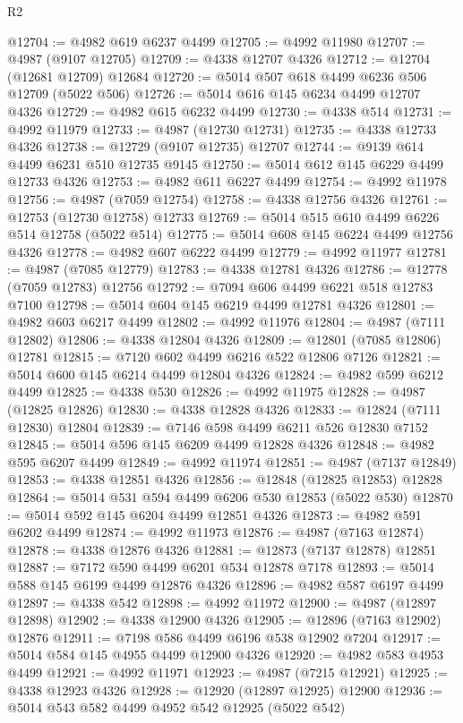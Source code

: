 \begin{lexlean}{R2}
\begin{coremodule}
@12704 := @4982 @619 @6237 @4499
@12705 := @4992 @11980
@12707 := @4987 (@9107 @12705)
@12709 := @4338 @12707 @4326
@12712 := @12704 (@12681 @12709) @12684
@12720 := @5014 @507 @618 @4499 @6236 @506 @12709 (@5022 @506)
@12726 := @5014 @616 @145 @6234 @4499 @12707 @4326
@12729 := @4982 @615 @6232 @4499
@12730 := @4338 @514
@12731 := @4992 @11979
@12733 := @4987 (@12730 @12731)
@12735 := @4338 @12733 @4326
@12738 := @12729 (@9107 @12735) @12707
@12744 := @9139 @614 @4499 @6231 @510 @12735 @9145
@12750 := @5014 @612 @145 @6229 @4499 @12733 @4326
@12753 := @4982 @611 @6227 @4499
@12754 := @4992 @11978
@12756 := @4987 (@7059 @12754)
@12758 := @4338 @12756 @4326
@12761 := @12753 (@12730 @12758) @12733
@12769 := @5014 @515 @610 @4499 @6226 @514 @12758 (@5022 @514)
@12775 := @5014 @608 @145 @6224 @4499 @12756 @4326
@12778 := @4982 @607 @6222 @4499
@12779 := @4992 @11977
@12781 := @4987 (@7085 @12779)
@12783 := @4338 @12781 @4326
@12786 := @12778 (@7059 @12783) @12756
@12792 := @7094 @606 @4499 @6221 @518 @12783 @7100
@12798 := @5014 @604 @145 @6219 @4499 @12781 @4326
@12801 := @4982 @603 @6217 @4499
@12802 := @4992 @11976
@12804 := @4987 (@7111 @12802)
@12806 := @4338 @12804 @4326
@12809 := @12801 (@7085 @12806) @12781
@12815 := @7120 @602 @4499 @6216 @522 @12806 @7126
@12821 := @5014 @600 @145 @6214 @4499 @12804 @4326
@12824 := @4982 @599 @6212 @4499
@12825 := @4338 @530
@12826 := @4992 @11975
@12828 := @4987 (@12825 @12826)
@12830 := @4338 @12828 @4326
@12833 := @12824 (@7111 @12830) @12804
@12839 := @7146 @598 @4499 @6211 @526 @12830 @7152
@12845 := @5014 @596 @145 @6209 @4499 @12828 @4326
@12848 := @4982 @595 @6207 @4499
@12849 := @4992 @11974
@12851 := @4987 (@7137 @12849)
@12853 := @4338 @12851 @4326
@12856 := @12848 (@12825 @12853) @12828
@12864 := @5014 @531 @594 @4499 @6206 @530 @12853 (@5022 @530)
@12870 := @5014 @592 @145 @6204 @4499 @12851 @4326
@12873 := @4982 @591 @6202 @4499
@12874 := @4992 @11973
@12876 := @4987 (@7163 @12874)
@12878 := @4338 @12876 @4326
@12881 := @12873 (@7137 @12878) @12851
@12887 := @7172 @590 @4499 @6201 @534 @12878 @7178
@12893 := @5014 @588 @145 @6199 @4499 @12876 @4326
@12896 := @4982 @587 @6197 @4499
@12897 := @4338 @542
@12898 := @4992 @11972
@12900 := @4987 (@12897 @12898)
@12902 := @4338 @12900 @4326
@12905 := @12896 (@7163 @12902) @12876
@12911 := @7198 @586 @4499 @6196 @538 @12902 @7204
@12917 := @5014 @584 @145 @4955 @4499 @12900 @4326
@12920 := @4982 @583 @4953 @4499
@12921 := @4992 @11971
@12923 := @4987 (@7215 @12921)
@12925 := @4338 @12923 @4326
@12928 := @12920 (@12897 @12925) @12900
@12936 := @5014 @543 @582 @4499 @4952 @542 @12925 (@5022 @542)

\end{coremodule}
\end{lexlean}
